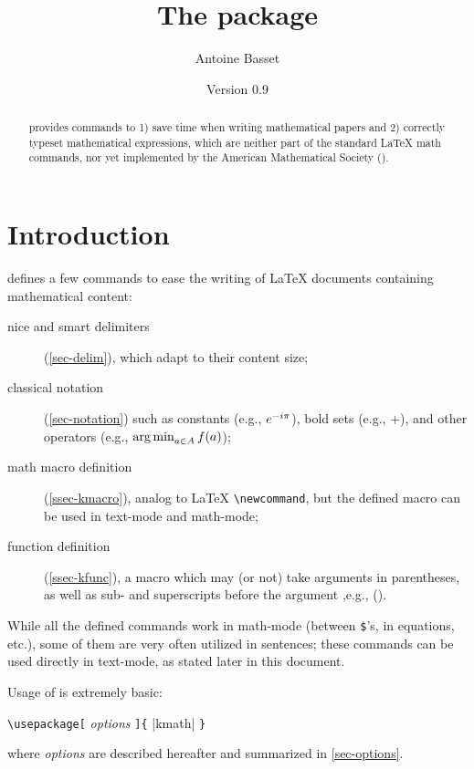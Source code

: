 \documentclass[10pt,a4paper]{article}
\title{The \kmath package}%
\author{Antoine Basset}
\date{Version 0.9}
\begin{document}
\sloppy
\maketitle


\vfill
\begin{abstract}
\kmath provides commands to
1) save time when writing mathematical papers and
2) correctly typeset mathematical expressions, which are neither part of the standard {\LaTeX} math commands, nor yet implemented by the American Mathematical Society (\AmS).
\end{abstract}
\vfill


\section*{Introduction}

\kmath defines a few commands to ease the writing of {\LaTeX} documents containing mathematical content:
\begin{description}
\item[nice and smart delimiters] (\cref{sec-delim}),
which adapt to their content size;
\item[classical notation] (\cref{sec-notation})
such as constants (e.g., $\kexp*(-\kiunit\kpi)$), bold sets (e.g., \kR*+), and other operators (e.g., $\kargmin_{a\in A} f(a)$);
\item[math macro definition] (\cref{ssec-kmacro}),
analog to {\LaTeX} \verb|\newcommand|,
but the defined macro can be used in text-mode and math-mode;
\item[function definition] (\cref{ssec-kfunc}),
a macro which may (or not) take arguments in parentheses, as well as sub- and superscripts before the argument%
{%
,e.g., \myfunc[i][2]().
}
\end{description}

While all the defined commands work in math-mode (between \verb|$|'s, in equations, etc.), some of them are very often utilized in sentences;
these commands can be used directly in text-mode, as stated later in this document.

Usage of \kmath is extremely basic:
\begin{kcode}
\verb|\usepackage[|%
\textit{options}%
\verb|]{|%
{\emphverb|kmath|}%
\verb|}|
\end{kcode}
where \textit{options} are described hereafter and summarized in \cref{sec-options}.
\end{document}
